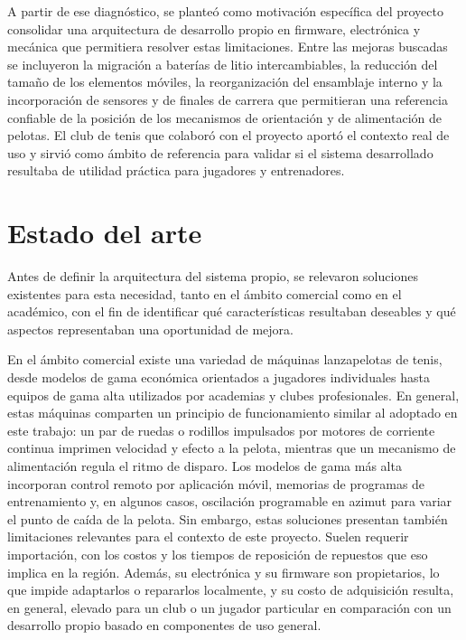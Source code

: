 A partir de ese diagnóstico, se planteó como motivación específica del proyecto consolidar una arquitectura de desarrollo propio en firmware, electrónica y mecánica que permitiera resolver estas limitaciones. Entre las mejoras buscadas se incluyeron la migración a baterías de litio intercambiables, la reducción del tamaño de los elementos móviles, la reorganización del ensamblaje interno y la incorporación de sensores y de finales de carrera que permitieran una referencia confiable de la posición de los mecanismos de orientación y de alimentación de pelotas. El club de tenis que colaboró con el proyecto aportó el contexto real de uso y sirvió como ámbito de referencia para validar si el sistema desarrollado resultaba de utilidad práctica para jugadores y entrenadores.

\section{Estado del arte}
\label{sec:estadoArte}

Antes de definir la arquitectura del sistema propio, se relevaron soluciones existentes para esta necesidad, tanto en el ámbito comercial como en el académico, con el fin de identificar qué características resultaban deseables y qué aspectos representaban una oportunidad de mejora.

En el ámbito comercial existe una variedad de máquinas lanzapelotas de tenis, desde modelos de gama económica orientados a jugadores individuales hasta equipos de gama alta utilizados por academias y clubes profesionales. En general, estas máquinas comparten un principio de funcionamiento similar al adoptado en este trabajo: un par de ruedas o rodillos impulsados por motores de corriente continua imprimen velocidad y efecto a la pelota, mientras que un mecanismo de alimentación regula el ritmo de disparo. Los modelos de gama más alta incorporan control remoto por aplicación móvil, memorias de programas de entrenamiento y, en algunos casos, oscilación programable en azimut para variar el punto de caída de la pelota. Sin embargo, estas soluciones presentan también limitaciones relevantes para el contexto de este proyecto. Suelen requerir importación, con los costos y los tiempos de reposición de repuestos que eso implica en la región. Además, su electrónica y su firmware son propietarios, lo que impide adaptarlos o repararlos localmente, y su costo de adquisición resulta, en general, elevado para un club o un jugador particular en comparación con un desarrollo propio basado en componentes de uso general.

